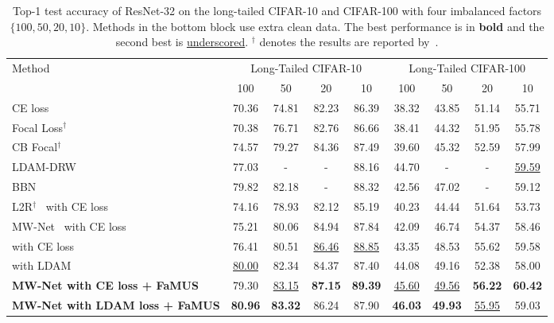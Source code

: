 \documentclass[final]{cvpr}
\begin{document}
\begin{table*}[ht]
	\centering
	\small
	\begin{tabular}{|l|c|c|c|c|c|c|c|c|}
		\hline
		\multirow{2}{*}{Method} & \multicolumn{4}{c|}{Long-Tailed CIFAR-10} & \multicolumn{4}{c|}{Long-Tailed CIFAR-100} \\
		\cline{2-9}
		 & 100 & 50 & 20 & 10 & 100 & 50 & 20 & 10 \\
		\hline
		CE loss & 70.36 & 74.81 & 82.23 & 86.39 & 38.32 & 43.85 & 51.14 & 55.71 \\
		\hline
		Focal Loss$^{\dagger}$~\cite{lin2017focal} & 70.38 & 76.71 & 82.76 & 86.66 & 38.41 & 44.32 & 51.95 & 55.78 \\
		\hline
		CB Focal$^{\dagger}$~\cite{cui2019class} & 74.57 & 79.27 & 84.36 & 87.49 & 39.60 & 45.32 & 52.59 & 57.99 \\
		
		\hline
		LDAM-DRW~\cite{cao2019learning}  & 77.03 & - & - & 88.16 & 44.70 & - & - & \underline{59.59} \\
		\hline
		BBN~\cite{zhou2020bbn} & 79.82 & 82.18 & - & 88.32 & 42.56 & 47.02 & - & 59.12 \\
		\hline\hline
		
		L2R$^{\dagger}$~\cite{ren2018learning} with CE loss & 74.16 & 78.93 & 82.12 & 85.19 & 40.23 & 44.44 & 51.64 & 53.73 \\
 		\hline
		MW-Net~\cite{shu2019meta} with CE loss & 75.21 & 80.06 & 84.94 & 87.84 & 42.09 & 46.74 & 54.37 & 58.46 \\ \hline                       		                        
		\cite{Jamal_2020_CVPR} with CE loss  &    76.41 & 80.51 & \underline{86.46} & \underline{88.85} &  43.35 & 48.53 & 55.62 & 59.58 \\
        \hline
		\cite{Jamal_2020_CVPR} with LDAM  & \underline{80.00} & 82.34 & 84.37 & 87.40 & 44.08 & 49.16 & 52.38 & 58.00 \\
		\hline
        \textbf{MW-Net with CE loss + FaMUS} & 79.30 & \underline{83.15} & \textbf{87.15} & \textbf{89.39} & \underline{45.60}	 & \underline{49.56} & \textbf{56.22} & \textbf{60.42} \\
		\hline
		\textbf{MW-Net with LDAM loss + FaMUS} & \textbf{80.96} & \textbf{83.32} & 86.24 & 87.90 & \textbf{46.03} & \textbf{49.93} & \underline{55.95}  & 59.03 \\
		\hline
	\end{tabular}\vspace{-3mm}
	\caption{Top-1 test accuracy of ResNet-32 on the long-tailed CIFAR-10 and CIFAR-100 with four imbalanced factors $\{100, 50, 20, 10\}$. Methods in the bottom block use extra clean data. The best performance is in \textbf{bold} and the second best is \underline{underscored}. $^{\dagger}$ denotes the results are reported by~\cite{cao2019learning}. }\label{tab:long_tailed_cifar}
	\vspace{-2mm}
\end{table*}
 
\end{document}
